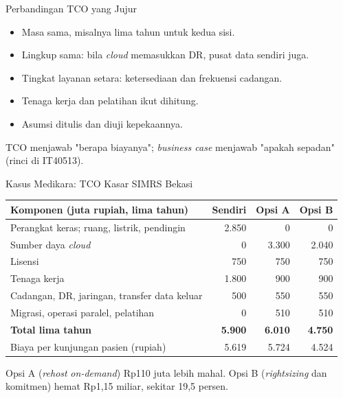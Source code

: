 \documentclass[aspectratio=169, table, 12pt]{beamer}
\begin{document}
\begin{frame}{{\Large Perbandingan TCO yang Jujur}}
  \vspace{10pt}
  \begin{itemize}
    \item Masa sama, misalnya lima tahun untuk kedua sisi.
    \item Lingkup sama: bila \textit{cloud} memasukkan DR, pusat data sendiri
          juga.
    \item Tingkat layanan setara: ketersediaan dan frekuensi cadangan.
    \item Tenaga kerja dan pelatihan ikut dihitung.
    \item Asumsi ditulis dan diuji kepekaannya.
  \end{itemize}
  \vspace{6pt}
  {\small TCO menjawab "berapa biayanya"; \textit{business case} menjawab
  "apakah sepadan" (rinci di IT40513).}
\end{frame}

\begin{frame}{{\Large Kasus Medikara: TCO Kasar SIMRS Bekasi}}
  \scriptsize
  \begin{tabularx}{\textwidth}{>{\raggedright\arraybackslash}X r r r}
    \hline
    \textbf{Komponen (juta rupiah, lima tahun)} & \textbf{Sendiri}
      & \textbf{Opsi A} & \textbf{Opsi B} \\
    \hline
    Perangkat keras; ruang, listrik, pendingin & 2.850 & 0 & 0 \\
    \hline
    Sumber daya \textit{cloud} & 0 & 3.300 & 2.040 \\
    \hline
    Lisensi & 750 & 750 & 750 \\
    \hline
    Tenaga kerja & 1.800 & 900 & 900 \\
    \hline
    Cadangan, DR, jaringan, transfer data keluar & 500 & 550 & 550 \\
    \hline
    Migrasi, operasi paralel, pelatihan & 0 & 510 & 510 \\
    \hline
    \textbf{Total lima tahun} & \textbf{5.900} & \textbf{6.010} & \textbf{4.750} \\
    \hline
    Biaya per kunjungan pasien (rupiah) & 5.619 & 5.724 & 4.524 \\
    \hline
  \end{tabularx}

  \vspace{8pt}
  \small
  Opsi A (\textit{rehost} \textit{on-demand}) Rp110 juta lebih mahal. Opsi B
  (\textit{rightsizing} dan komitmen) hemat Rp1,15 miliar, sekitar 19,5 persen.
\end{frame}
\end{document}
